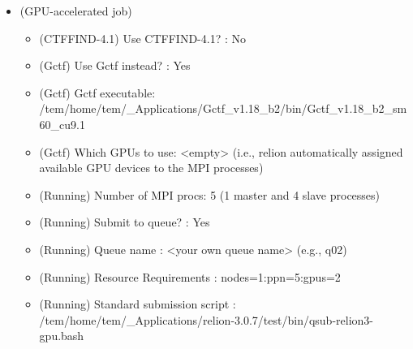 \documentclass[letterpaper,10pt,english]{sphinxmanual}
\begin{document}
\begin{itemize}
\item {} 
 (GPU-accelerated job)
\begin{itemize}
\item {} 
(CTFFIND-4.1) Use CTFFIND-4.1? : No

\item {} 
(Gctf) Use Gctf instead? : Yes

\item {} 
(Gctf) Gctf executable: /tem/home/tem/\_Applications/Gctf\_v1.18\_b2/bin/Gctf\_v1.18\_b2\_sm60\_cu9.1

\item {} 
(Gctf) Which GPUs to use: \textless{}empty\textgreater{} (i.e., relion automatically assigned available GPU devices to the MPI processes)

\item {} 
(Running) Number of MPI procs: 5 (1 master and 4 slave processes)

\item {} 
(Running) Submit to queue? : Yes

\item {} 
(Running) Queue name : \textless{}your own queue name\textgreater{} (e.g., q02)

\item {} 
(Running) Resource Requirements : nodes=1:ppn=5:gpus=2

\item {} 
(Running) Standard submission script : /tem/home/tem/\_Applications/relion-3.0.7/test/bin/qsub-relion3-gpu.bash

\end{itemize}

\end{itemize}


\end{document}
